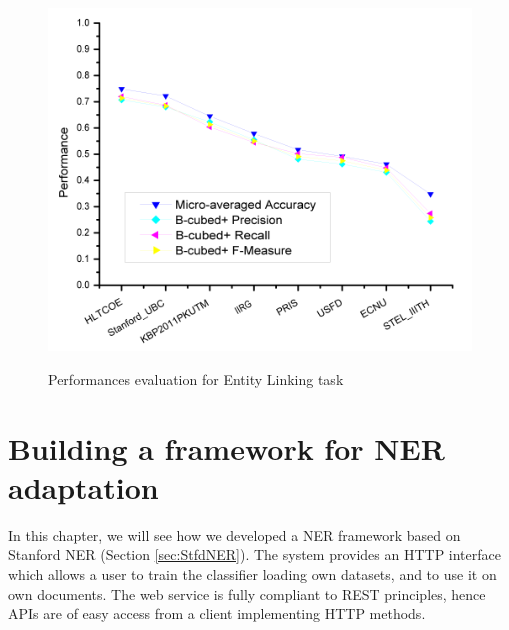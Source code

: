 \documentclass[a4paper,11pt]{report}
\begin{document}
\begin{figure}[htbp]
{\includegraphics[width=\textwidth/2]{kbp2011-optional_scores}}
\caption{Performances evaluation for Entity Linking task}
\label{fig:elresults}
\end{figure}
\chapter{Building a framework for NER adaptation}
\label{ch:pimp}
In this chapter, we will see how we developed a NER framework based on Stanford NER (Section \ref{sec:StfdNER}). The system provides an HTTP interface which allows a user to train the classifier loading own datasets, and to use it on own documents. %
The web service is fully compliant to REST principles, %
hence APIs are of easy access from a client implementing HTTP methods. 
\end{document}
